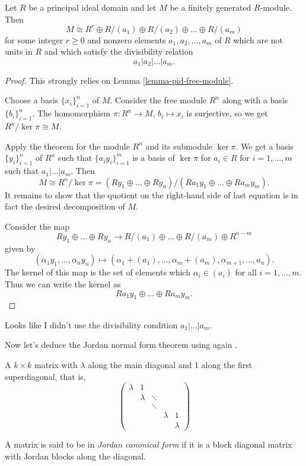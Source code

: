 \begin{theorem}
\label{theorem-invariant-factors}
Let $R$ be a principal ideal domain and
let $M$ be a finitely generated $R$-module.
Then
$$
M\cong R^r\oplus R/(a_1)\oplus R/(a_2)
\oplus \ldots\oplus R/(a_m)
$$
for some integer $r\geq 0$ and nonzero
elements $a_1,a_2,\ldots,a_m$ of $R$ which
are not units in $R$ and which satisfy the
divisibility relation
$$
a_1|a_2|\ldots|a_m.
$$
\end{theorem}

\begin{proof}
This strongly relies on 
Lemma \ref{lemma-pid-free-module}.

Choose a basis $\{x_i\}_{i=1}^n$ of $M$.
Consider the free module $R^n$ along with a
basis $\{b_i\}_{i=1}^n$. The homomorphism
$\pi:R^n\to M$, $b_i\mapsto x_i$ is
surjective, so we get
$R^n/\ker \pi\cong M$.

Apply the theorem for the module $R^n$ and
its submodule $\ker \pi$. We get a basis
$\{y_i\}_{i=1}^n$ of $R^n$ such that
$\{a_iy_i\}_{i=1}^m$ is a basis of
$\ker \pi$ for $a_i\in R$ for
$i=1,\ldots,m$ such that
$a_1|\ldots|a_m$. Then
$$
M\cong R^n/\ker \pi
=
(Ry_1\oplus \ldots\oplus Ry_n)/
(Ra_1y_1\oplus \ldots\oplus Ra_my_m).
$$
It remains to show that the quotient on the
right-hand side of last equation is in fact
the desired decomposition of $M$.

Consider the map
$$
Ry_1\oplus \ldots\oplus Ry_n
\longrightarrow
R/(a_1)\oplus \ldots\oplus R/(a_m)
\oplus R^{n-m}
$$
given by
$$
(\alpha_1y_1,\ldots,\alpha_ny_n)
\longmapsto
(\alpha_1+(a_1),\ldots,\alpha_m+(a_m),
\alpha_{m+1},\ldots,a_n).
$$
The kernel of this map is the set of
elements which $\alpha_i\in(a_i)$ for all
$i=1,\ldots,m$. Thus we can write the
kernel as
$$
Ra_1y_1\oplus \ldots\oplus Ra_my_m.
$$
\end{proof}

\noindent
Looks like I didn't use the divisibility
condition $a_1|\ldots|a_m$.

\medskip\noindent
Now let's deduce the Jordan normal form
theorem using again \cite{dummit}. 

\begin{definition}
\label{definition-jordan-form}
A $k\times k$ matrix with $\lambda$
along the main diagonal
and 1 along the first
superdiagonal, that is,
$$
\begin{pmatrix} 
\lambda & 1\\
& \lambda & \ddots\\
& & \ddots\\
& & & \lambda & 1\\
& & &   & \lambda
\end{pmatrix} 
$$


A matrix is said to be in {\it Jordan
canonical form} if it is a block
diagonal matrix with Jordan blocks 
along the diagonal.
\end{definition}

